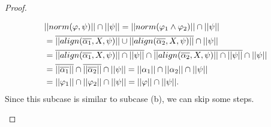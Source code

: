 \documentclass{lmcs}
\def\norm{norm}
\def\al{align}
\begin{document}
\begin{proof}
\begin{enumerate}
\begin{enumerate}
\begin{align}
&||\norm(\varphi,\psi)||\cap||\psi||=||\norm(\varphi_1\wedge\varphi_2)||\cap||\psi||\notag\\
&=\overline{||\al(\overline{\alpha_1},X,\psi)||\cup||\al(\overline{\alpha_2},X,\psi)||} \cap||\psi||\notag\\
&=\overline{||\al(\overline{\alpha_1},X,\psi)||\cap||\psi||}\cap\overline{||\al(\overline{\alpha_2},X,\psi)||\cap||\psi||} \cap||\psi||\notag\\
&=\overline{||\overline{\alpha_1}||}\cap\overline{||\overline{\alpha_2}||} \cap||\psi||=||\alpha_1||\cap||\alpha_2||\cap||\psi||\notag\\
&=||\varphi_1||\cap||\varphi_2|| \cap||\psi||=||\varphi||\cap||\psi||.\notag
\end{align}
Since this subcase is similar to subcase (b), we can skip some steps. 
\end{enumerate}
  

\end{enumerate}
\end{proof}
\end{document}
